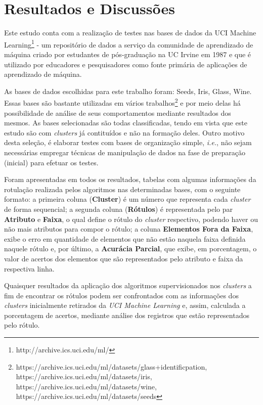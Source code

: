  \chapter{Resultados e Discussões}\label{cap:resultados}


Este estudo conta com a realização de testes nas bases de dados da UCI Machine Learning\footnote{http://archive.ics.uci.edu/ml/} - um repositório de dados a serviço da comunidade de aprendizado de máquina criado por estudantes de pós-graduação na UC Irvine em 1987 e que é utilizado por educadores e pesquisadores como fonte primária de aplicações de aprendizado de máquina. 
 


As bases de dados escolhidas para este trabalho foram: Seeds, Iris, Glass, Wine. Essas bases são bastante utilizadas em vários trabalhos\footnote{https://archive.ics.uci.edu/ml/datasets/glass+identificpation, https://archive.ics.uci.edu/ml/datasets/iris, https://archive.ics.uci.edu/ml/datasets/wine, https://archive.ics.uci.edu/ml/datasets/seeds} e por meio delas há possibilidade de análise de seus comportamentos mediante  resultados dos mesmos. As bases selecionadas são todas classificadas, tendo em vista que este estudo são com  \textit{clusters} já contituídos e não na formação deles. Outro motivo desta seleção, é elaborar testes com bases de organização simple, \textit{i.e.}, não sejam necessárias empregar técnicas de manipulação de dados  \cite{Casari2018} na fase de preparação (inicial) para efetuar os testes.

Foram apresentadas em todos os resultados, tabelas com algumas informações da rotulação realizada pelos algoritmos nas determinadas bases,  com o seguinte formato: a primeira coluna (\textbf{Cluster}) é um número que representa cada \textit{cluster} de forma sequencial; a segunda coluna (\textbf{Rótulos}) é representada pelo par \textbf{Atributo} e \textbf{Faixa}, o qual define o rótulo do \textit{cluster} respectivo, podendo haver ou não mais atributos para compor o rótulo; a coluna \textbf{Elementos Fora da Faixa}, exibe o erro em quantidade de elementos que não estão naquela faixa definida naquele rótulo e, por último, a \textbf{Acurácia Parcial}, que exibe, em porcentagem, o valor de acertos dos elementos que são representados pelo atributo e faixa da respectiva linha. 

Quaisquer resultados da aplicação dos algoritmos supervisionados nos \textit{clusters} a fim de encontrar os rótulos podem ser confrontados com as informações dos \textit{clusters} inicialmente retirados da \textit{UCI Machine Learning} e, assim, calculada a porcentagem de acertos, mediante análise dos registros que estão representados pelo rótulo.


